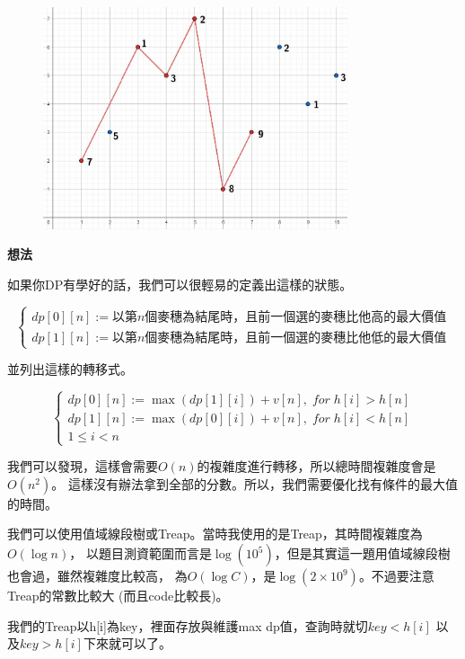     \begin{figure}[!htbp]
        \centering
        \includegraphics[width=0.8\textwidth]{../Images/DP4.jpg}
    \end{figure}

    \textbf{想法}

    如果你DP有學好的話，我們可以很輕易的定義出這樣的狀態。

    $$\begin{cases}
        dp[0][n] := 以第n個麥穗為結尾時，
        且前一個選的麥穗比他高的最大價值\\
        dp[1][n] := 以第n個麥穗為結尾時，
        且前一個選的麥穗比他低的最大價值
    \end{cases}$$

    並列出這樣的轉移式。

    $$\begin{cases}
        dp[0][n] := \max(dp[1][i])+v[n], \; for \; h[i]>h[n]\\
        dp[1][n] := \max(dp[0][i])+v[n], \; for \; h[i]<h[n] \\
        1 \le i < n
    \end{cases}$$

    我們可以發現，這樣會需要$O(n)$的複雜度進行轉移，所以總時間複雜度會是$O(n^2)$。
    這樣沒有辦法拿到全部的分數。所以，我們需要優化找有條件的最大值的時間。

    我們可以使用值域線段樹或Treap。當時我使用的是Treap，其時間複雜度為$O(\log n)$，
    以題目測資範圍而言是$\log(10^5)$，但是其實這一題用值域線段樹也會過，雖然複雜度比較高，
    為$O(\log C)$，是$\log(2 \times 10^9)$。不過要注意Treap的常數比較大
    (而且code比較長)。

    我們的Treap以h[i]為key，裡面存放與維護max dp值，查詢時就切$key<h[i]$
    以及$key>h[i]$下來就可以了。


